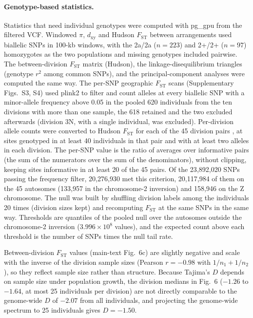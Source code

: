 \documentclass[11pt]{article}
\newcommand{\Fst}{F_\mathrm{ST}}
\newcommand{\dxy}{d_\mathrm{xy}}
\begin{document}
\paragraph{Genotype-based statistics.}
Statistics that need individual genotypes were computed with pg\_gpu \citep{pggpu} from the filtered VCF.
Windowed $\pi$, $\dxy$ and Hudson $\Fst$ between arrangements used biallelic SNPs in 100-kb windows, with the 2a/2a
($n=223$) and 2+/2+ ($n=97$) homozygotes as the two populations and missing genotypes included pairwise. The between-division $\Fst$ matrix (Hudson), the linkage-disequilibrium triangles (genotype $r^2$ among common SNPs), and the principal-component analyses were computed the same way. The per-SNP geographic $\Fst$ scans (Supplementary Figs.~S3, S4) used plink2 \citep{chang2015plink2} to filter and count alleles at every biallelic SNP with a minor-allele frequency above 0.05 in the pooled 620 individuals from the ten divisions with more than one sample, the 618 retained and the two excluded afterwards (division 3N, with a single individual, was excluded). Per-division allele counts were converted to Hudson $\Fst$ for each of the 45 division pairs \citep{bhatia2013}, at sites genotyped in at least 40 individuals in that pair and with at least two alleles in each division. The per-SNP value is the ratio of averages over informative pairs (the sum of the numerators over the sum of the denominators), without clipping, keeping sites informative in at least 20 of the 45 pairs. Of the 23{,}892{,}020 SNPs passing the frequency filter, 20{,}276{,}930 met this criterion, 20{,}117{,}984 of them on the 45 autosomes (133{,}957 in the chromosome-2 inversion) and 158{,}946 on the Z chromosome. The null was built by shuffling division labels among the individuals 20 times (division sizes kept) and recomputing $\Fst$ at the same SNPs in the same way. Thresholds are quantiles of the pooled null over the autosomes outside the chromosome-2 inversion ($3.996\times10^{8}$ values), and the expected count above each threshold is the number of SNPs times the null tail rate.

Between-division $\Fst$ values (main-text Fig.~6c) are slightly negative and scale with the inverse of the division sample sizes (Pearson $r=-0.98$ with $1/n_1+1/n_2$), so they reflect sample size rather than structure. Because Tajima's $D$ depends on sample size under population growth, the division medians in Fig.~6 ($-1.26$ to $-1.64$, at most 25 individuals per division) are not directly comparable to the genome-wide $D$ of $-2.07$ from all individuals, and projecting the genome-wide spectrum to 25 individuals gives $D=-1.50$.
\end{document}
